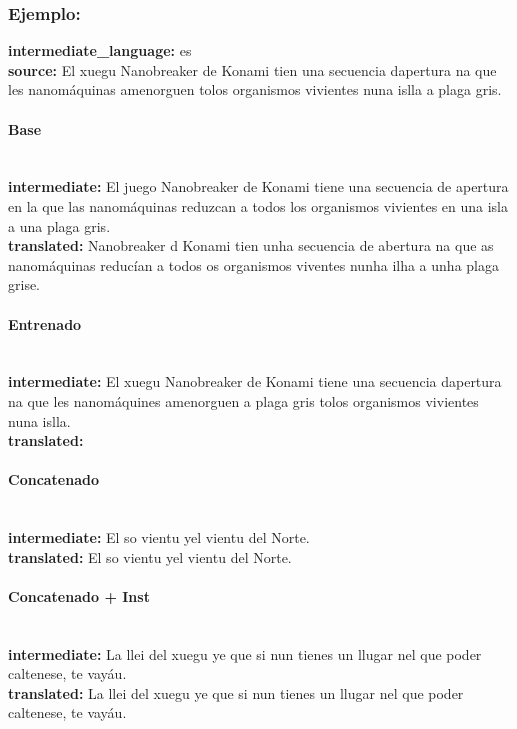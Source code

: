 \subsubsection{Ejemplo:}
\textbf{intermediate\_language:} es\\
\textbf{source:} El xuegu Nanobreaker de Konami tien una secuencia d\textquotesingle{}apertura na que les nanomáquinas amenorguen tolos organismos vivientes nuna islla a plaga gris.

\paragraph{Base}~\\
\textbf{intermediate:} El juego Nanobreaker de Konami tiene una secuencia de apertura en la que las nanomáquinas reduzcan a todos los organismos vivientes en una isla a una plaga gris.\\
\textbf{translated:} Nanobreaker d Konami tien unha secuencia de abertura na que as nanomáquinas reducían a todos os organismos viventes nunha ilha a unha plaga grise.

\paragraph{Entrenado}~\\
\textbf{intermediate:} El xuegu Nanobreaker de Konami tiene una secuencia d\textquotesingle{}apertura na que les nanomáquines amenorguen a plaga gris tolos organismos vivientes nuna islla.\\
\textbf{translated:} 

\paragraph{Concatenado}~\\
\textbf{intermediate:} El so vientu ye\textquotesingle{}l vientu del Norte.\\
\textbf{translated:} El so vientu ye\textquotesingle{}l vientu del Norte.

\paragraph{Concatenado + Inst}~\\
\textbf{intermediate:} La llei del xuegu ye que si nun tienes un llugar nel que poder caltenese, te vayáu.\\
\textbf{translated:} La llei del xuegu ye que si nun tienes un llugar nel que poder caltenese, te vayáu.

